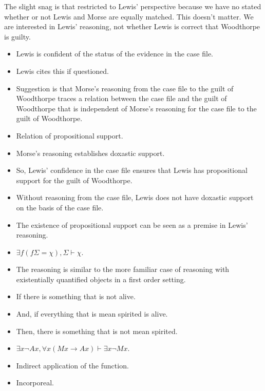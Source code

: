 \documentclass[10pt]{article}
\begin{document}
The slight snag is that restricted to Lewis' perspective because we have no stated whether or not Lewis and Morse are equally matched.
This doesn't matter.
We are interested in Lewis' reasoning, not whether Lewis is correct that Woodthorpe is guilty.


\begin{itemize}
\item Lewis is confident of the status of the evidence in the case file.
\item Lewis cites this if questioned.
\item Suggestion is that Morse's reasoning from the case file to the guilt of Woodthorpe traces a relation between the case file and the guilt of Woodthorpe that is independent of Morse's reasoning for the case file to the guilt of Woodthorpe.
\item Relation of propositional support.
\item Morse's reasoning establishes doxastic support.
\item So, Lewis' confidence in the case file ensures that Lewis has propositional support for the guilt of Woodthorpe.
\item Without reasoning from the case file, Lewis does not have doxastic support on the basis of the case file.
\end{itemize}

\begin{itemize}
\item The existence of propositional support can be seen as a premise in Lewis' reasoning.
\item \(\exists f(f\Sigma = \chi), \Sigma \vdash \chi\).
\item The reasoning is similar to the more familiar case of reasoning with existentially quantified objects in a first order setting.
\item If there is something that is not alive.
\item And, if everything that is mean spirited is alive.
\item Then, there is something that is not mean spirited.
\item \(\exists x \lnot Ax, \forall x (Mx \rightarrow Ax) \vdash \exists x \lnot Mx\).
\end{itemize}

\begin{itemize}
\item Indirect application of the function.
\item Incorporeal.
\end{itemize}
\end{document}
